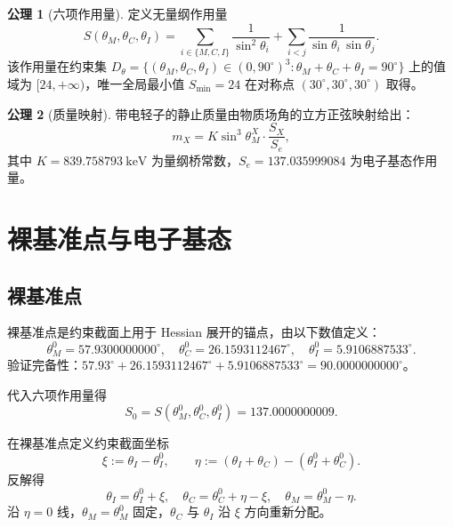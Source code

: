 \documentclass[12pt,a4paper]{article}
\theoremstyle{definition}
\newtheorem{axiom}{公理}
\begin{document}
\begin{axiom}[六项作用量]
定义无量纲作用量
\begin{equation}
\boxed{S(\theta_M,\theta_C,\theta_I)=\sum_{i\in\{M,C,I\}}\frac{1}{\sin^2\theta_i}+\sum_{i<j}\frac{1}{\sin\theta_i\,\sin\theta_j}.}
\end{equation}
该作用量在约束集 $D_\theta=\{(\theta_M,\theta_C,\theta_I)\in(0,90^\circ)^3:\theta_M+\theta_C+\theta_I=90^\circ\}$ 上的值域为 $[24,+\infty)$，唯一全局最小值 $S_{\min}=24$ 在对称点 $(30^\circ,30^\circ,30^\circ)$ 取得。
\end{axiom}

\begin{axiom}[质量映射]
带电轻子的静止质量由物质场角的立方正弦映射给出：
\begin{equation}
\boxed{m_X=K\sin^3\theta_M^X\cdot\frac{S_X}{S_e},}
\end{equation}
其中 $K=839.758793~\mathrm{keV}$ 为量纲桥常数，$S_e=137.035999084$ 为电子基态作用量。
\end{axiom}

\section{裸基准点与电子基态}

\subsection{裸基准点}

裸基准点是约束截面上用于 Hessian 展开的锚点，由以下数值定义：
\begin{equation}
\boxed{\theta_M^0=57.9300000000^\circ,\quad \theta_C^0=26.1593112467^\circ,\quad \theta_I^0=5.9106887533^\circ.}
\end{equation}
验证完备性：$57.93^\circ+26.1593112467^\circ+5.9106887533^\circ=90.0000000000^\circ$。

代入六项作用量得
\begin{equation}
S_0=S(\theta_M^0,\theta_C^0,\theta_I^0)=137.0000000009.
\end{equation}

在裸基准点定义约束截面坐标
\begin{equation}
\xi:=\theta_I-\theta_I^0,\qquad \eta:=(\theta_I+\theta_C)-(\theta_I^0+\theta_C^0).
\end{equation}
反解得
\begin{equation}
\theta_I=\theta_I^0+\xi,\quad \theta_C=\theta_C^0+\eta-\xi,\quad \theta_M=\theta_M^0-\eta.
\end{equation}
沿 $\eta=0$ 线，$\theta_M=\theta_M^0$ 固定，$\theta_C$ 与 $\theta_I$ 沿 $\xi$ 方向重新分配。
\end{document}

